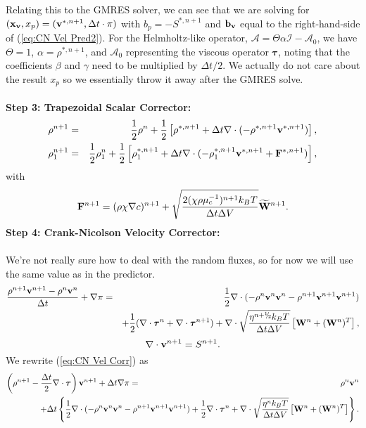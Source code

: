 \documentclass[final]{siamltex}
\newcommand{\sfrac}[2]{\mathchoice
  {\kern0em\raise.5ex\hbox{\the\scriptfont0 #1}\kern-.15em/
   \kern-.15em\lower.25ex\hbox{\the\scriptfont0 #2}}
  {\kern0em\raise.5ex\hbox{\the\scriptfont0 #1}\kern-.15em/
   \kern-.15em\lower.25ex\hbox{\the\scriptfont0 #2}}
  {\kern0em\raise.5ex\hbox{\the\scriptscriptfont0 #1}\kern-.2em/
   \kern-.15em\lower.25ex\hbox{\the\scriptscriptfont0 #2}}
  {#1\!/#2}}
\def\bb {{\bf b}}
\def\Fb {{\bf F}}
\def\vb {{\bf v}}
\def\Wb {{\bf W}}
\def\xb {{\bf x}}
\def\taub {\boldsymbol{\tau}}
\def\half   {\frac{1}{2}}
\def\myhalf {\sfrac{1}{2}}
\begin{document}
Relating this to the GMRES solver, we can see that we are solving for 
$(\xb_\vb,x_p) = (\vb^{*,n+1},\Delta t\cdot\pi)$ with $b_p = -S^{*,n+1}$ and $\bb_\vb$ equal to the 
right-hand-side of (\ref{eq:CN Vel Pred2}).  For the Helmholtz-like operator, 
$\mathcal{A}=\Theta\alpha\mathcal{I} - \mathcal{A}_0$, we have $\Theta=1$, $\alpha=\rho^{*,n+1}$,
and $\mathcal{A}_0$ representing the viscous operator $\taub$, noting that the coefficients
$\beta$ and $\gamma$ need to be multiplied by $\Delta t/2$.  We actually do not care about
the result $x_p$ so we essentially throw it away after the GMRES solve.\\ \\
{\bf Step 3: Trapezoidal Scalar Corrector:}
\begin{eqnarray}
\rho^{n+1} &=& \half\rho^n + \half\left[\rho^{*,n+1} + \Delta t\nabla\cdot(-\rho^{*,n+1}\vb^{*,n+1})\right],\\
\rho_1^{n+1} &=& \half\rho_1^n + \half\left[\rho_1^{*,n+1} + \Delta t\nabla\cdot(-\rho_1^{*,n+1}\vb^{*,n+1} + \Fb^{*,n+1})\right],
\end{eqnarray}
with
\begin{equation}
\Fb^{n+1} = (\rho\chi\nabla c)^{n+1} + \sqrt{\frac{2(\chi\rho\mu_c^{-1})^{n+1}k_BT}{\Delta t\Delta V}}\widetilde\Wb^{n+1}.
\end{equation}
{\bf Step 4: Crank-Nicolson Velocity Corrector:}\\ \\
We're not really sure how to deal with the random fluxes, so for now we will use the same value as in the predictor.
\begin{eqnarray}
\frac{\rho^{n+1}\vb^{n+1} - \rho^n\vb^n}{\Delta t} + \nabla\pi &=& \half\nabla\cdot(-\rho^n\vb^n\vb^n - \rho^{n+1}\vb^{n+1}\vb^{n+1})\nonumber\\
&&+ \half(\nabla\cdot\taub^n + \nabla\cdot\taub^{n+1}) + \nabla\cdot\sqrt{\frac{\eta^{n+\myhalf} k_B T}{\Delta t\Delta V}}\left[\Wb^n + (\Wb^n)^T\right],\label{eq:CN Vel Corr}
\end{eqnarray}
\begin{equation}
\nabla\cdot\vb^{n+1} = S^{n+1}.
\end{equation}
We rewrite (\ref{eq:CN Vel Corr}) as
\begin{eqnarray}
\left(\rho^{n+1} - \frac{\Delta t}{2}\nabla\cdot\taub\right)\vb^{n+1} + \Delta t\nabla\pi &=& \rho^n\vb^n\nonumber\\
&&\hspace{-1.75in}+ \Delta t\left\{\half\nabla\cdot(-\rho^n\vb^n\vb^n-\rho^{n+1}\vb^{n+1}\vb^{n+1}) + \half\nabla\cdot\taub^n + \nabla\cdot\sqrt{\frac{\eta^n k_B T}{\Delta t\Delta V}}\left[\Wb^n + (\Wb^n)^T\right]\right\}.\nonumber\\
\end{eqnarray}
\end{document}

